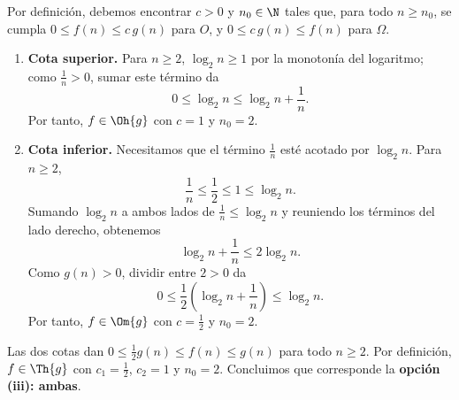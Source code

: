 
Por definición, debemos encontrar $c>0$ y $n_0\in\N$ tales que, para todo $n\ge n_0$, se cumpla $0\le f(n)\le c\,g(n)$ para $O$, y $0\le c\,g(n)\le f(n)$ para $\Omega$.

\begin{enumerate}
\item \textbf{Cota superior.} Para $n\ge2$, $\log_2 n\ge1$ por la monotonía del logaritmo; como $\frac1n>0$, sumar este término da
\[
0\le\log_2 n\le\log_2 n+\frac1n.
\]
Por tanto, $f\in\Oh{g}$ con $c=1$ y $n_0=2$.

\item \textbf{Cota inferior.} Necesitamos que el término $\frac1n$ esté acotado por $\log_2 n$. Para $n\ge2$,
\[
\frac1n\le\frac12\le1\le\log_2 n.
\]
Sumando $\log_2 n$ a ambos lados de $\frac1n\le\log_2 n$ y reuniendo los términos del lado derecho, obtenemos
\[
\log_2 n+\frac1n\le2\log_2 n.
\]
Como $g(n)>0$, dividir entre $2>0$ da
\[
0\le\frac12\left(\log_2 n+\frac1n\right)\le\log_2 n.
\]
Por tanto, $f\in\Om{g}$ con $c=\frac12$ y $n_0=2$.
\end{enumerate}

Las dos cotas dan $0\le\frac12g(n)\le f(n)\le g(n)$ para todo $n\ge2$. Por definición, $f\in\Th{g}$ con $c_1=\frac12$, $c_2=1$ y $n_0=2$. Concluimos que corresponde la \textbf{opción (iii): ambas}.
\fin
